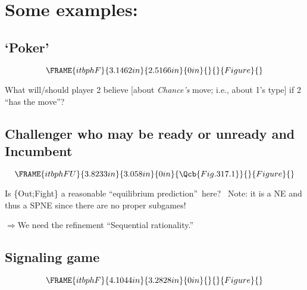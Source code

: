 \documentclass{article}
\begin{document}
\bigskip

\section{Some examples:}

\subsection{\textbf{`Poker'}}

\[
\FRAME{itbphF}{3.1462in}{2.5166in}{0in}{}{}{Figure}{\special{language
"Scientific Word";type "GRAPHIC";maintain-aspect-ratio TRUE;display
"USEDEF";valid_file "T";width 3.1462in;height 2.5166in;depth
0in;original-width 4.6799in;original-height 3.584in;cropleft "0";croptop
"1";cropright "1";cropbottom "0";tempfilename
'JSY1RZ06.wmf';tempfile-properties "XPR";}} 
\]

What will/should player 2 believe [about \textit{Chance's }move; i.e., about
1's type] if 2 \textquotedblleft has the move\textquotedblright ?

\bigskip

\subsection{Challenger who may be ready or unready and Incumbent}

\begin{equation}
\FRAME{itbphFU}{3.8233in}{3.058in}{0in}{\Qcb{Fig. 317.1}}{}{Figure}{\special%
{language "Scientific Word";type "GRAPHIC";maintain-aspect-ratio
TRUE;display "USEDEF";valid_file "T";width 3.8233in;height 3.058in;depth
0in;original-width 5.6886in;original-height 3.5201in;cropleft "0";croptop
"1";cropright "1";cropbottom "0";tempfilename
'JSY1RZ07.wmf';tempfile-properties "XPR";}}
\end{equation}

Is \{Out;Fight\} a reasonable \textquotedblleft equilibrium
prediction\textquotedblright\ here? \ Note: it is a NE and thus a SPNE since
there are no proper subgames!

$\Rightarrow $We need the refinement \textquotedblleft Sequential
rationality.\textquotedblright

\bigskip

\subsection{Signaling game}

\[
\FRAME{itbphF}{4.1044in}{3.2828in}{0in}{}{}{Figure}{\special{language
"Scientific Word";type "GRAPHIC";maintain-aspect-ratio TRUE;display
"USEDEF";valid_file "T";width 4.1044in;height 3.2828in;depth
0in;original-width 7.8006in;original-height 5.7164in;cropleft "0";croptop
"1";cropright "1";cropbottom "0";tempfilename
'JSY1RZ08.wmf';tempfile-properties "XPR";}} 
\]
\end{document}
